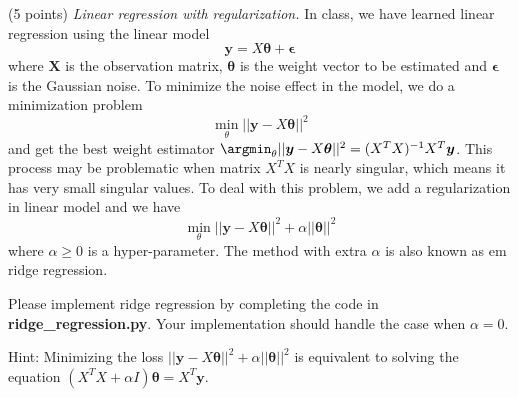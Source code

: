 \documentclass[a4paper, 12pt]{exam}
\begin{document}
	\begin{questions}
		\question (5 points) \emph{Linear regression with regularization.} In class, we have learned linear regression using the linear model
		\begin{equation*}
		\bm{y} = X\bm{\theta} + \bm{\epsilon}
		\end{equation*}
		where $\bm{X}$ is the observation matrix,
		$\bm{\theta}$ is the weight vector to be estimated and $\bm{\epsilon}$ is the Gaussian noise. To minimize the noise effect in the model, we do a minimization problem
		\begin{equation*}
		\min_{\theta}||\bm{y} - X\bm{\theta}||^2
		\end{equation*}
		and get the best weight estimator
		$\argmin_{\theta}||\bm{y} - X\bm{\theta}||^2 = (X^TX)^{-1}X^T\bm{y}$.
		This process may be problematic when matrix $X^TX$ is nearly singular, which means it has very small singular values. %
		To deal with this problem, we add a regularization in linear model and we have
		\begin{equation*}
		\min_{\theta} ||\bm{y} - X\bm{\theta}||^2 + \alpha ||\bm{\theta}||^2
		\end{equation*}
		where $\alpha \geq 0$ is a hyper-parameter. The method with extra $\alpha$ is also known as {em ridge regression}.
		
		Please implement ridge regression  by completing the code in  \textbf{ridge\_regression.py}.
		Your implementation should handle the case when $\alpha=0$.
		
		Hint: Minimizing the loss $||\bm{y} - X\bm{\theta}||^2 + \alpha ||\bm{\theta}||^2$ is equivalent to solving the equation
		$( X^T X+ \alpha I)\bm{\theta}  = X^T \bm{y}$.
		

\end{questions}
\end{document}
